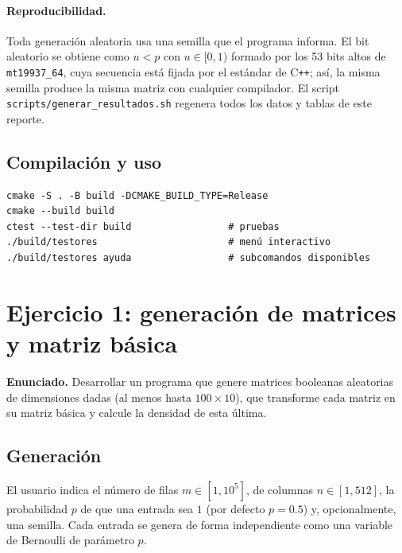 \documentclass[11pt, a4paper]{article}
\theoremstyle{definition}
\theoremstyle{plain}
\begin{document}
\paragraph{Reproducibilidad.} Toda generación aleatoria usa una semilla que el
programa informa. El bit aleatorio se obtiene como $u<p$ con $u\in[0,1)$ formado
por los 53 bits altos de \texttt{mt19937\_64}, cuya secuencia está fijada por el
estándar de C\texttt{++}; así, la misma semilla produce la misma matriz con
cualquier compilador. El script \texttt{scripts/generar\_resultados.sh}
regenera todos los datos y tablas de este reporte.

\subsection{Compilación y uso}

\begin{Verbatim}[fontsize=\small, frame=single]
cmake -S . -B build -DCMAKE_BUILD_TYPE=Release
cmake --build build
ctest --test-dir build                 # pruebas
./build/testores                       # menú interactivo
./build/testores ayuda                 # subcomandos disponibles
\end{Verbatim}



\section{Ejercicio 1: generación de matrices y matriz básica}

\textbf{Enunciado.} Desarrollar un programa que genere matrices booleanas
aleatorias de dimensiones dadas (al menos hasta $100\times 10$), que transforme
cada matriz en su matriz básica y calcule la densidad de esta última.

\subsection{Generación}
El usuario indica el número de filas $m\in[1,10^5]$, de columnas
$n\in[1,512]$, la probabilidad $p$ de que una entrada sea $1$ (por defecto
$p=0.5$) y, opcionalmente, una semilla. Cada entrada se genera de forma
independiente como una variable de Bernoulli de parámetro $p$.
\end{document}
